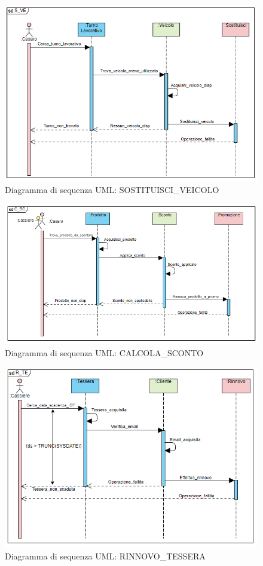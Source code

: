 \documentclass[12pt]{report}
\begin{document}
\begin{figure}[H]
\centering
\includegraphics[scale=1]{imgs/UML/sdS_VE.PNG}
\caption{Diagramma di sequenza UML: SOSTITUISCI\_VEICOLO}
\end{figure}

\begin{figure}[H]
\centering
\includegraphics[scale=1]{imgs/UML/sdC_SC.PNG}
\caption{Diagramma di sequenza UML: CALCOLA\_SCONTO}
\end{figure}

\begin{figure}[H]
\centering
\includegraphics[scale=1]{imgs/UML/sdR_TE.PNG}
\caption{Diagramma di sequenza UML: RINNOVO\_TESSERA}
\end{figure}
\end{document}
